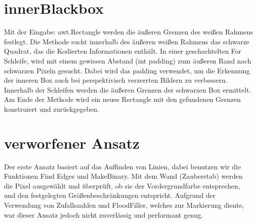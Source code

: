 \documentclass[a4paper,11pt,parskip]{article}
\begin{document}
\section{innerBlackbox}
Mit der Eingabe: awt.Rectangle werden die äußeren Grenzen des weißen Rahmens festlegt.
Die Methode sucht innerhalb des äußeren weißen Rahmens das schwarze Quadrat, das die Kodierten Informationen enthält. In einer geschachtelten For Schleife, wird mit einem gewissen Abstand (int padding) zum äußeren Rand nach schwarzen Pixeln gesucht. Dabei wird das padding verwendet, um die Erkennung der inneren Box auch bei perspektivisch verzerrten Bildern zu verbessern. Innerhalb der Schleifen werden die äußeren Grenzen der schwarzen Box ermittelt. Am Ende der Methode wird ein neues Rectangle mit den gefundenen Grenzen konstruiert und zurückgegeben.


\section{verworfener Ansatz}
Der erste Ansatz basiert auf das Auffinden von Linien, dabei benutzen wir die Funktionen Find Edges und MakeBinary. Mit dem Wand (Zauberstab) werden die Pixel ausgewählt und überprüft, ob sie der Vordergrundfarbe entsprechen, und den festgelegten Größenbeschränkungen entspricht. Aufgrund der Verwendung von Zufallszahlen und FloodFiller, welches zur Markierung diente, war dieser Ansatz jedoch nicht zuverlässig und performant genug.
\end{document}
